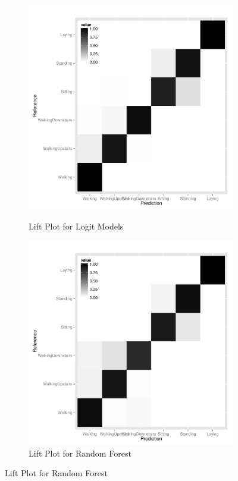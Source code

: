 \begin{landscape}
\begin{figure}
  \centering
  \begin{subfigure}[b]{0.45\textwidth}
    \caption{Lift Plot for Logit Models}
    \includegraphics[width=\textwidth]{heatmap_dmr.pdf}
    \label{fig:lift_lin}
  \end{subfigure}
  \hfill
  \begin{subfigure}[b]{0.45\textwidth}
    \caption{Lift Plot for Random Forest}
    \includegraphics[width=\textwidth]{heatmap_rf.pdf}

\end{subfigure}
\end{figure}
\end{landscape}

